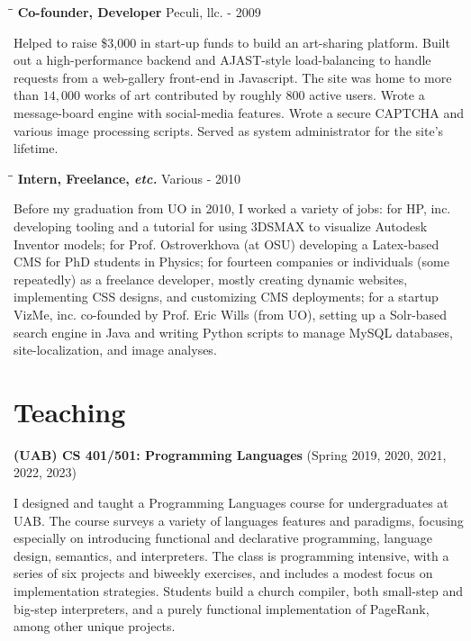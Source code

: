 \documentclass[line]{res}
\begin{document}
\begin{resume}
   \vspace{-0.2cm}  
   \begin{tabbing}
    \hspace{2.25in}\= \hspace{2.25in}\= \kill %
    {\bf Co-founder, Developer} \>Peculi, llc.     - 2009
   \end{tabbing}\vspace{-0.5cm}      %
   Helped to raise \$3,000 in start-up funds to build an art-sharing platform. Built out a high-performance backend and AJAST-style
   load-balancing to handle requests from a web-gallery front-end in Javascript. The site was home to more than $14,000$ works of art contributed
   by roughly $800$ active users. Wrote a message-board engine with social-media features. Wrote a secure CAPTCHA and various image processing
   scripts. Served as system administrator for the site's lifetime.
   \vspace{-0.2cm}  
   \begin{tabbing}
    \hspace{2.25in}\= \hspace{2.25in}\= \kill %
    {\bf Intern, Freelance, \textit{etc.}} \>Various      - 2010
   \end{tabbing}\vspace{-0.5cm}      %
    Before my graduation from UO in 2010, I worked a variety of jobs: for HP, inc. developing tooling and a tutorial for using 3DSMAX to visualize Autodesk Inventor models; for Prof. Ostroverkhova (at OSU) developing a Latex-based CMS for PhD students in Physics; for fourteen companies or individuals (some repeatedly) as a freelance developer, mostly creating dynamic websites, implementing CSS designs, and customizing CMS deployments; for a startup VizMe, inc. co-founded by Prof. Eric Wills (from UO), setting up a Solr-based search engine in Java and writing Python scripts to manage MySQL databases, site-localization, and image analyses.
    
\section{\large Teaching} \vspace{0.2in}
    
\textbf{(UAB) CS 401/501: Programming Languages} (Spring 2019, 2020, 2021, 2022, 2023)

I designed and taught a Programming Languages course for undergraduates at UAB. The course surveys a variety of languages features and paradigms, focusing especially on introducing functional and declarative programming, language design, semantics, and interpreters. The class is programming intensive, with a series of six projects and biweekly exercises, and includes a modest focus on implementation strategies. Students build a church compiler, both small-step and big-step interpreters, and a purely functional implementation of PageRank, among other unique projects.


\end{resume}
\end{document}

